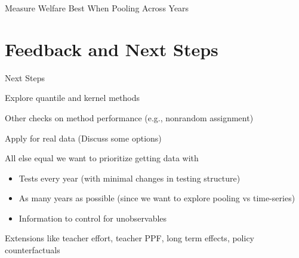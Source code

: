 \documentclass[t,aspectratio=169,11pt]{beamer}
\newenvironment{wideitemize}{\itemize\addtolength{\itemsep}{14pt}}{\enditemize}
\begin{document}
\begin{frame}{Measure Welfare Best When Pooling Across Years}
\begin{figure}
\end{figure}
\vfill
\end{frame}




\section{Feedback and Next Steps}

\begin{frame}[label=next]{Next Steps}

\begin{wideitemize}
    \item Explore quantile and kernel methods
    
    \hyperlink{methods}{}
    
    \item Other checks on method performance (e.g., nonrandom assignment)
    
    \item Apply for real data  (Discuss some options)
    
    \item All else equal we want to prioritize getting data with
    \begin{itemize}
        \item Tests every year (with minimal changes in testing structure)
        \item As many years as possible (since we want to explore pooling vs time-series)
        \item Information to control for unobservables \citep[e.g.,][]{schellenberg2020parents}
    \end{itemize}
    
    \item Extensions like teacher effort, teacher PPF, long term effects, policy counterfactuals
\end{wideitemize}

\end{frame}
\end{document}
